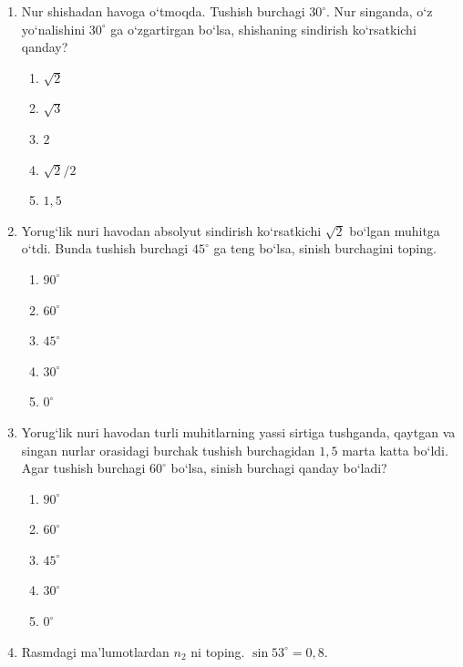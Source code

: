 \begin{enumerate}
\item Nur shishadan havoga o‘tmoqda. Tushish burchagi $30^\circ$. Nur singanda, o‘z yo‘nalishini $30^\circ$ ga o‘zgartirgan bo‘lsa, shishaning sindirish ko‘rsatkichi qanday?
\begin{enumerate}[label=\Alph*)]
\item $\sqrt{2}$
\item $\sqrt{3}$
\item $2$
\item $\sqrt{2}/2$
\item $1,5$
\end{enumerate}

\item Yorug‘lik nuri havodan absolyut sindirish ko‘rsatkichi $\sqrt{2}$ bo‘lgan muhitga o‘tdi. Bunda tushish burchagi $45^\circ$ ga teng bo‘lsa, sinish burchagini toping.
\begin{enumerate}[label=\Alph*)]
\item $90^\circ$
\item $60^\circ$
\item $45^\circ$
\item $30^\circ$
\item $0^\circ$
\end{enumerate}

\item Yorug‘lik nuri havodan turli muhitlarning yassi sirtiga tushganda, qaytgan va singan nurlar orasidagi burchak tushish burchagidan $1,5$ marta katta bo‘ldi. Agar tushish burchagi $60^\circ$ bo‘lsa, sinish burchagi qanday bo‘ladi?
\begin{enumerate}[label=\Alph*)]
\item $90^\circ$
\item $60^\circ$
\item $45^\circ$
\item $30^\circ$
\item $0^\circ$
\end{enumerate}

\item Rasmdagi ma’lumotlardan $n_2$ ni toping. $\sin53^\circ=0,8$.

\end{enumerate}
